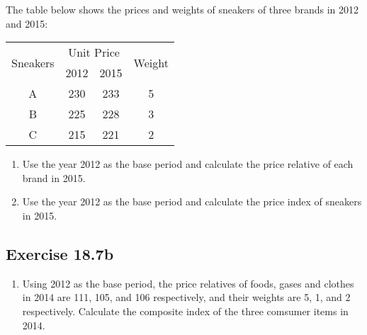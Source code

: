 \documentclass{report}
\begin{document}
\begin{multicols}{2}
  The table below shows the prices and weights of sneakers of three brands in
  2012 and 2015:
  \begin{center}
    \begin{tabular}{|c|c|c|c|}
      \hline
      \multirow{2}{*}{Sneakers} & \multicolumn{2}{c|}{Unit Price} & \multirow{2}{*}{Weight}     \\
      \cline{2-3}
                                & 2012                            & 2015                    &   \\
      \hline
      A                         & 230                             & 233                     & 5 \\
      B                         & 225                             & 228                     & 3 \\
      C                         & 215                             & 221                     & 2 \\
      \hline
    \end{tabular}
  \end{center}
  \begin{enumerate}
    \item Use the year 2012 as the base period and calculate the price relative of each
          brand in 2015.
    \item Use the year 2012 as the base period and calculate the price index of sneakers
          in 2015.
  \end{enumerate}

  \subsection{Exercise 18.7b}

  \begin{enumerate}
    \item Using 2012 as the base period, the price relatives of foods, gases and clothes
          in 2014 are 111, 105, and 106 respectively, and their weights are 5, 1, and 2
          respectively. Calculate the composite index of the three comsumer items in
          2014.


\end{enumerate}
\end{multicols}
\end{document}
